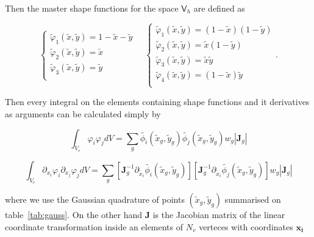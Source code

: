\documentclass[3p]{elsarticle}
\begin{document}

Then the master shape functions for the space $\bm{\mathsf{V}}_h$ are defined as

\begin{equation}
\left\{
\begin{array}{ll}
\tilde{\varphi}_1(\tilde{x},\tilde{y}) = 1 - \tilde{x} - \tilde{y}\\
\tilde{\varphi}_2(\tilde{x},\tilde{y}) = \tilde{x}\\
\tilde{\varphi}_3(\tilde{x},\tilde{y}) = \tilde{y}\\
\end{array}
\right.
\quad
\left\{
\begin{array}{ll}
\tilde{\varphi}_1(\tilde{x},\tilde{y}) = (1 - \tilde{x})(1 - \tilde{y})\\
\tilde{\varphi}_2(\tilde{x},\tilde{y}) = \tilde{x}(1 - \tilde{y})\\
\tilde{\varphi}_3(\tilde{x},\tilde{y}) = \tilde{x}\tilde{y}\\
\tilde{\varphi}_4(\tilde{x},\tilde{y}) = (1 - \tilde{x})\tilde{y}\\
\end{array}
\right.
.
\end{equation}

Then every integral on the elements containing shape functions and it derivatives as arguments
can be calculated simply by

\begin{equation}
\int_{V_{e}} \varphi_i \varphi_j dV = \sum_{g}
\tilde{\phi_i}(\tilde{x}_g,\tilde{y}_g) 
\tilde{\phi_j}(\tilde{x}_g,\tilde{y}_g) 
w_g |\bm{J}_g|
\end{equation}

\begin{equation}
\int_{V_{e}} \partial_{x_i}\varphi_i \partial_{x_j}\varphi_j dV = \sum_{g}
\left[
\bm{J}_g^{-1}\partial_{\tilde{x}_i}\tilde{\phi_i}(\tilde{x}_g,\tilde{y}_g)
\right]
\left[
\bm{J}_g^{-1}\partial_{\tilde{x}_i}\tilde{\phi_j}(\tilde{x}_g,\tilde{y}_g) 
\right]
w_g |\bm{J}_g|
\end{equation}

where we use the Gaussian quadrature of points $(\tilde{x}_g,\tilde{y}_g)$
summarised on table~\ref{tab:gauss}. On the other hand $\bm{J}$ is the
Jacobian matrix of the linear coordinate transformation inside an elements of
$N_v$ verteces with coordinates $\bm{x_i}$
\end{document}

